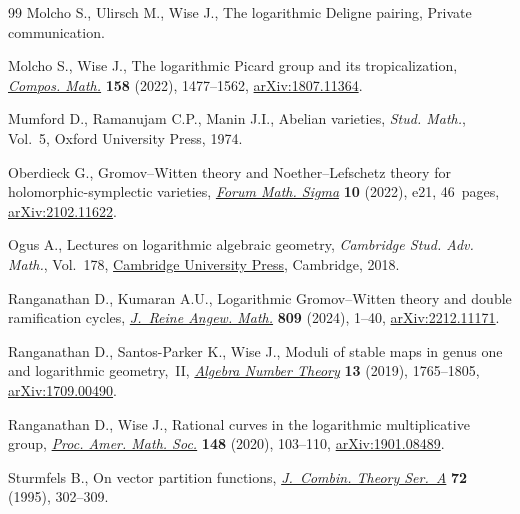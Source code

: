 \documentclass[pdftex]{sigma}
\numberwithin{equation}{section}
\theoremstyle{definition}
\begin{document}
\begin{thebibliography}{99}
Molcho S., Ulirsch M., Wise J., The logarithmic {D}eligne pairing, {P}rivate
 communication.

Molcho S., Wise J., The logarithmic {P}icard group and its tropicalization,
 \href{https://doi.org/10.1112/s0010437x22007527}{\textit{Compos. Math.}}
 \textbf{158} (2022), 1477--1562,
 \href{http://arxiv.org/abs/1807.11364}{arXiv:1807.11364}.

Mumford D., Ramanujam C.P., Manin J.I., Abelian varieties, \textit{Stud.
 Math.}, Vol.~5, Oxford University Press, 1974.

Oberdieck G., Gromov--{W}itten theory and {N}oether--{L}efschetz theory for
 holomorphic-symplectic varieties,
 \href{https://doi.org/10.1017/fms.2022.10}{\textit{Forum Math. Sigma}}
 \textbf{10} (2022), e21, 46~pages,
 \href{http://arxiv.org/abs/2102.11622}{arXiv:2102.11622}.

Ogus A., Lectures on logarithmic algebraic geometry, \textit{Cambridge Stud.
 Adv. Math.}, Vol.~178, \href{https://doi.org/10.1017/9781316941614}{Cambridge
 University Press}, Cambridge, 2018.

Ranganathan D., Kumaran A.U., Logarithmic {G}romov--{W}itten theory and double
 ramification cycles,
 \href{https://doi.org/10.1515/crelle-2023-0100}{\textit{J.~Reine Angew.
 Math.}} \textbf{809} (2024), 1--40,
 \href{http://arxiv.org/abs/2212.11171}{arXiv:2212.11171}.

Ranganathan D., Santos-Parker K., Wise J., Moduli of stable maps in genus one
 and logarithmic geometry,~{II},
 \href{https://doi.org/10.2140/ant.2019.13.1765}{\textit{Algebra Number
 Theory}} \textbf{13} (2019), 1765--1805,
 \href{http://arxiv.org/abs/1709.00490}{arXiv:1709.00490}.

Ranganathan D., Wise J., Rational curves in the logarithmic multiplicative
 group, \href{https://doi.org/10.1090/proc/14749}{\textit{Proc. Amer. Math.
 Soc.}} \textbf{148} (2020), 103--110,
 \href{http://arxiv.org/abs/1901.08489}{arXiv:1901.08489}.

Sturmfels B., On vector partition functions,
 \href{https://doi.org/10.1016/0097-3165(95)90067-5}{\textit{J.~Combin. Theory
 Ser.~A}} \textbf{72} (1995), 302--309.

\end{thebibliography}\LastPageEnding
\end{document}
